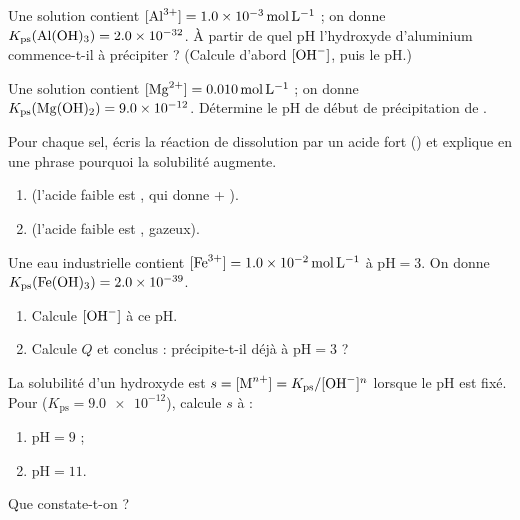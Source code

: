 \documentclass[11pt,a4paper]{article}
\begin{document}
\begin{exo}
Une solution contient $[\ce{Al^{3+}}]=\qty{1.0e-3}{\mole\per\litre}$ ; on donne
$K_{\mathrm{ps}}(\ce{Al(OH)3})=\num{2.0e-32}$. À partir de quel pH l'hydroxyde d'aluminium commence-t-il
à précipiter ? (Calcule d'abord $[\ce{OH-}]$, puis le pH.)
\end{exo}

\begin{exo}
Une solution contient $[\ce{Mg^{2+}}]=\qty{0.010}{\mole\per\litre}$ ; on donne
$K_{\mathrm{ps}}(\ce{Mg(OH)2})=\num{9.0e-12}$. Détermine le pH de début de précipitation de
.
\end{exo}

\begin{exo}
Pour chaque sel, écris la réaction de dissolution par un acide fort () et explique en une
phrase pourquoi la solubilité augmente.
\begin{enumerate}[label=\alph*)]
  \item {} (l'acide faible est , qui donne  + ).
  \item {} (l'acide faible est , gazeux).
\end{enumerate}
\end{exo}

\begin{exo}[\ce{Fe(OH)3} précipite-t-il à pH $=3$ ?]
Une eau industrielle contient $[\ce{Fe^{3+}}]=\qty{1.0e-2}{\mole\per\litre}$ à
$\mathrm{pH}=3$. On donne $K_{\mathrm{ps}}(\ce{Fe(OH)3})=\num{2.0e-39}$.
\begin{enumerate}[label=\alph*)]
  \item Calcule $[\ce{OH-}]$ à ce pH.
  \item Calcule $Q$ et conclus :  précipite-t-il déjà à $\mathrm{pH}=3$ ?
\end{enumerate}
\end{exo}

\begin{exo}
La solubilité d'un hydroxyde est $s=[\ce{M^{n+}}]=K_{\mathrm{ps}}/[\ce{OH-}]^{n}$ lorsque le pH est
fixé. Pour  ($K_{\mathrm{ps}}=\num{9.0e-12}$), calcule $s$ à :
\begin{enumerate}[label=\alph*)]
  \item $\mathrm{pH}=9$ ;
  \item $\mathrm{pH}=11$.
\end{enumerate}
Que constate-t-on ?
\end{exo}
\end{document}
